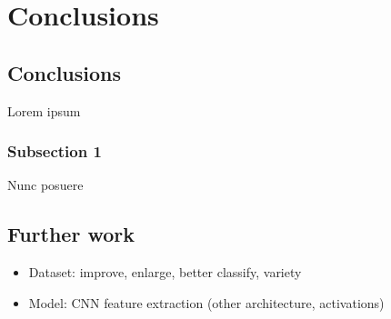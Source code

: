 
\chapter{Conclusions}

\label{Chapter6}


\section{Conclusions}

Lorem ipsum

\subsection{Subsection 1}

Nunc posuere

\section{Further work}

\begin{itemize}
	\item Dataset: improve, enlarge, better classify, variety
	\item Model: CNN feature extraction (other architecture, activations)	
\end{itemize}